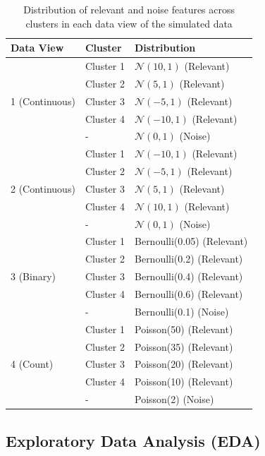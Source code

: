 \begin{table}[ht]
\centering
\caption{Distribution of relevant and noise features across clusters in each data view of the simulated data}
\label{tab:simulated_data}
\begin{tabular}{|l|l|l|}
\hline
\textbf{Data View} & \textbf{Cluster} & \textbf{Distribution} \\
\hline
\multirow{5}{*}{1 (Continuous)} 
& Cluster 1 & $\mathcal{N}(10, 1)$ (Relevant) \\
& Cluster 2 & $\mathcal{N}(5, 1)$ (Relevant) \\
& Cluster 3 & $\mathcal{N}(-5, 1)$ (Relevant) \\
& Cluster 4 & $\mathcal{N}(-10, 1)$ (Relevant) \\
& -         & $\mathcal{N}(0, 1)$ (Noise) \\
\hline
\multirow{5}{*}{2 (Continuous)} 
& Cluster 1 & $\mathcal{N}(-10, 1)$ (Relevant) \\
& Cluster 2 & $\mathcal{N}(-5, 1)$ (Relevant) \\
& Cluster 3 & $\mathcal{N}(5, 1)$ (Relevant) \\
& Cluster 4 & $\mathcal{N}(10, 1)$ (Relevant) \\
& -         & $\mathcal{N}(0, 1)$ (Noise) \\
\hline
\multirow{5}{*}{3 (Binary)} 
& Cluster 1 & Bernoulli(0.05) (Relevant) \\
& Cluster 2 & Bernoulli(0.2) (Relevant) \\
& Cluster 3 & Bernoulli(0.4) (Relevant) \\
& Cluster 4 & Bernoulli(0.6) (Relevant) \\
& -         & Bernoulli(0.1) (Noise) \\
\hline
\multirow{5}{*}{4 (Count)} 
& Cluster 1 & Poisson(50) (Relevant) \\
& Cluster 2 & Poisson(35) (Relevant) \\
& Cluster 3 & Poisson(20) (Relevant) \\
& Cluster 4 & Poisson(10) (Relevant) \\
& -         & Poisson(2) (Noise) \\
\hline
\end{tabular}
\end{table}

\subsection{Exploratory Data Analysis (EDA)}

